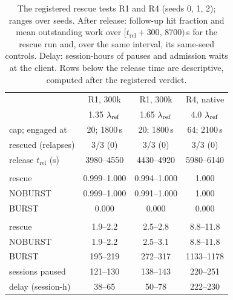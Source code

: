 \begin{table}[htbp]
\centering\footnotesize
\caption{The registered rescue tests R1 and R4 (seeds 0, 1, 2); ranges over seeds. After release: follow-up hit fraction and mean
outstanding work over $[t_{\mathrm{rel}}+300,\,8700)$\,s for the rescue run and, over the same interval, its same-seed controls.
Delay: session-hours of pauses and admission waits at the client. Rows below the release time are descriptive, computed after the
registered verdict.}\label{tab:rescue}
\setlength{\tabcolsep}{3pt}
\begin{tabular}{@{}>{\raggedright\arraybackslash}p{2.3cm} c c c@{}}
\toprule
 & R1, 300k & R1, 300k & R4, native\\
 & 1.35 $\lambda_{\mathrm{ref}}$ & 1.65 $\lambda_{\mathrm{ref}}$ & 4.0 $\lambda_{\mathrm{ref}}$\\
\midrule
cap; engaged at & 20; 1800\,s & 20; 1800\,s & 64; 2100\,s\\
rescued (relapses) & 3/3 (0) & 3/3 (0) & 3/3 (0)\\
release $t_{\mathrm{rel}}$ (s) & 3980--4550 & 4430--4920 & 5980--6140\\
\addlinespace
\multicolumn{4}{@{}l}{\emph{after release: follow-up hit fraction}}\\
\quad rescue & 0.999--1.000 & 0.994--1.000 & 1.000\\
\quad NOBURST & 0.999--1.000 & 0.991--1.000 & 1.000\\
\quad BURST & 0.000 & 0.000 & 0.000\\
\multicolumn{4}{@{}l}{\emph{after release: mean outstanding work}}\\
\quad rescue & 1.9--2.2 & 2.5--2.8 & 8.8--11.8\\
\quad NOBURST & 1.9--2.2 & 2.5--3.1 & 8.8--11.8\\
\quad BURST & 195--219 & 272--317 & 1133--1178\\
\addlinespace
sessions paused & 121--130 & 138--143 & 220--251\\
delay (session-h) & 38--65 & 50--78 & 222--230\\
\bottomrule
\end{tabular}
\end{table}

